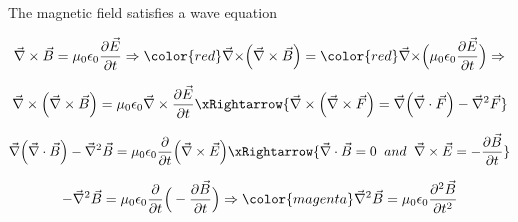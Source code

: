 \begin{frame}{The magnetic field satisfies a wave equation}

\begin{equation*}
  \vec{\nabla} \times \vec{B} =
  \mu_0 \epsilon_0 \frac{\partial \vec{E}}{\partial t}
  \Rightarrow
  {\color{red} \vec{\nabla} \times} \Big( \vec{\nabla} \times \vec{B} \Big) =
  {\color{red} \vec{\nabla} \times} \Big( \mu_0 \epsilon_0 \frac{\partial \vec{E}}{\partial t} \Big)
  \Rightarrow
\end{equation*}

\begin{equation*}
  \vec{\nabla} \times \Big( \vec{\nabla} \times \vec{B} \Big) =
  \mu_0 \epsilon_0  \vec{\nabla} \times \frac{\partial \vec{E}}{\partial t}
  \xRightarrow{ \vec{\nabla} \times \Big( \vec{\nabla} \times \vec{F} \Big) =
                \vec{\nabla} \Big( \vec{\nabla} \cdot \vec{F} \Big) - \vec{\nabla}^{2} \vec{F} }
\end{equation*}

\begin{equation*}
  \vec{\nabla} \Big( \vec{\nabla} \cdot \vec{B} \Big) - \vec{\nabla}^{2} \vec{B} =
  \mu_0 \epsilon_0  \frac{\partial}{\partial t} \Big( \vec{\nabla} \times \vec{E} \Big)
  \xRightarrow{ \vec{\nabla} \cdot \vec{B} = 0 \;\; and \;\;
                \vec{\nabla} \times \vec{E} = - \frac{\partial \vec{B}}{\partial t} }
\end{equation*}

\begin{equation*}
  - \vec{\nabla}^{2} \vec{B} =
  \mu_0 \epsilon_0  \frac{\partial}{\partial t} \Big(  - \frac{\partial \vec{B}}{\partial t} \Big)
  \Rightarrow
  {\color{magenta}
    \vec{\nabla}^{2} \vec{B} = \mu_0 \epsilon_0 \frac{\partial^{2} \vec{B}}{\partial t^{2}}
  }
\end{equation*}

\end{frame}

%
%
%
%

